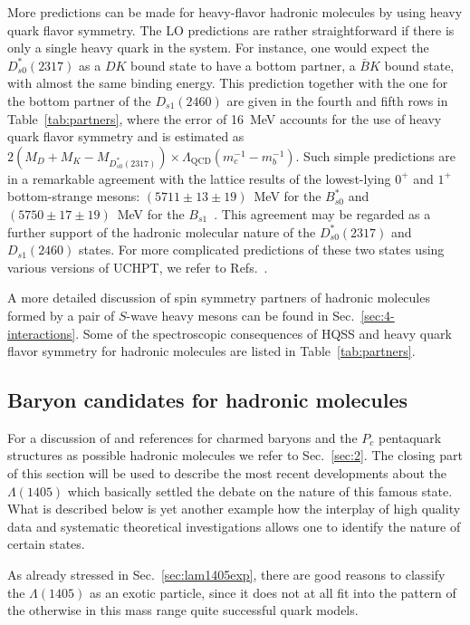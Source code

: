 More predictions can be made for heavy-flavor hadronic molecules by using heavy
quark flavor symmetry. The LO predictions are rather straightforward if there is
only a single heavy quark in the system. For instance, one would expect the
$D_{s0}^*(2317)$ as a $DK$ bound state to have a bottom partner, a $\bar B K$
bound state, with almost the same binding energy. This prediction together with
the one for the bottom partner of the $D_{s1}(2460)$ are given in the fourth and
fifth rows in Table~\ref{tab:partners}, where the error of 16~MeV accounts for
the use of heavy quark flavor symmetry and is estimated as $2\left( M_D+M_K-
M_{D_{s0}^*(2317) } \right)\times \Lambda_\text{QCD}(m_c^{-1}-m_b^{-1}) $. Such
simple predictions are in a remarkable agreement with the lattice results of the
lowest-lying $0^+$ and $1^+$ bottom-strange mesons:
$(5711\pm13\pm19)$~MeV for the $B_{s0}^*$ and $(5750\pm17\pm19)$~MeV for the
$B_{s1}$~\cite{Lang:2015hza}. This agreement may be regarded as a further
support of the hadronic molecular nature of the $D_{s0}^*(2317)$ and
$D_{s1}(2460)$ states.
For more complicated predictions of these two states using various versions of
UCHPT, we refer to
Refs.~\cite{Kolomeitsev:2003ac,Guo:2006fu,Guo:2006rp,Cleven:2010aw,
Altenbuchinger:2013vwa,Torres-Rincon:2014ffa,Cleven:2014oka}.

A more detailed discussion of spin symmetry partners of hadronic molecules
formed by a pair of $S$-wave heavy mesons can be found in
Sec.~\ref{sec:4-interactions}. Some of the spectroscopic consequences of HQSS
and heavy quark flavor symmetry for hadronic molecules are listed in
Table~\ref{tab:partners}.


\subsection{Baryon candidates for hadronic molecules}
\label{sec:1405th}

For a discussion of and references for charmed baryons and the $P_c$
pentaquark structures as
possible hadronic molecules we refer to Sec.~\ref{sec:2}.
The closing part of this section will be used to describe the most
recent developments about the $\Lambda(1405)$ which basically
settled the debate on the nature of this famous state. What is described
below is yet another example how the interplay of high quality data
and systematic theoretical investigations allows one to identify
the nature of certain states.


As already stressed in Sec.~\ref{sec:lam1405exp}, there are good reasons to
classify the $\Lambda(1405)$ as  an exotic particle, since it does not at all
fit into the pattern of the otherwise in this mass range quite successful quark
models.


